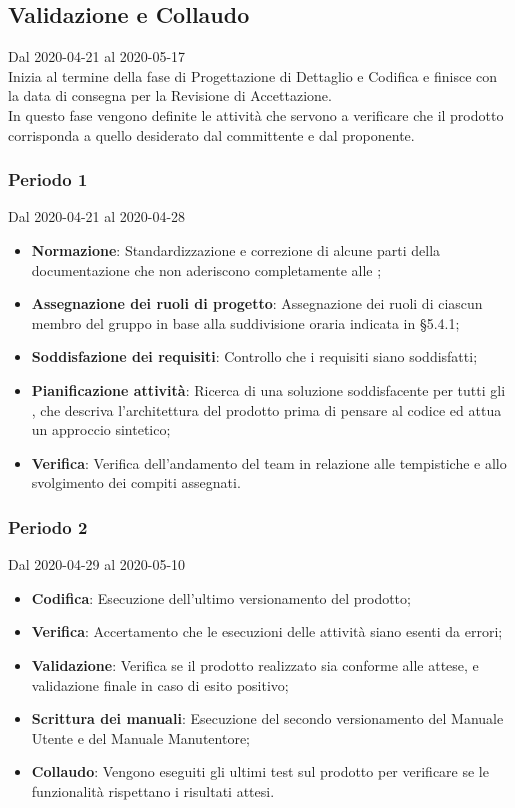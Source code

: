 \subsection{Validazione e Collaudo}
Dal 2020-04-21 al 2020-05-17\\
Inizia al termine della fase di Progettazione di Dettaglio e Codifica e finisce con la data di consegna per la Revisione di Accettazione.\\
In questo fase vengono definite le attività che servono a verificare che il prodotto corrisponda a quello desiderato dal committente e dal proponente.

\subsubsection{Periodo 1} 
Dal 2020-04-21 al 2020-04-28
\begin{itemize}
	\item \textbf{Normazione}: Standardizzazione e correzione di alcune parti della documentazione che non aderiscono completamente alle \NdP{};
	\item \textbf{Assegnazione dei ruoli di progetto}: Assegnazione dei ruoli di ciascun membro del gruppo in base alla suddivisione oraria indicata in §5.4.1;
	\item \textbf{Soddisfazione dei requisiti}: Controllo che i requisiti siano soddisfatti;
	\item \textbf{Pianificazione attività}: Ricerca di una soluzione soddisfacente per tutti gli , che descriva l'architettura del prodotto prima di pensare al codice ed attua un approccio sintetico;
	\item \textbf{Verifica}: Verifica dell'andamento del team in relazione alle tempistiche e allo svolgimento dei compiti assegnati.
\end{itemize}

\subsubsection{Periodo 2} 
Dal 2020-04-29 al 2020-05-10
\begin{itemize}
	\item \textbf{Codifica}: Esecuzione dell'ultimo versionamento del prodotto;
	\item \textbf{Verifica}: Accertamento che le esecuzioni delle attività siano esenti da errori;
	\item \textbf{Validazione}: Verifica se il prodotto realizzato sia conforme alle attese, e validazione finale in caso di esito positivo;
	\item \textbf{Scrittura dei manuali}: Esecuzione del secondo versionamento del Manuale Utente e del Manuale Manutentore;
	\item \textbf{Collaudo}: Vengono eseguiti gli ultimi test sul prodotto per verificare se le funzionalità rispettano i risultati attesi.
\end{itemize}

